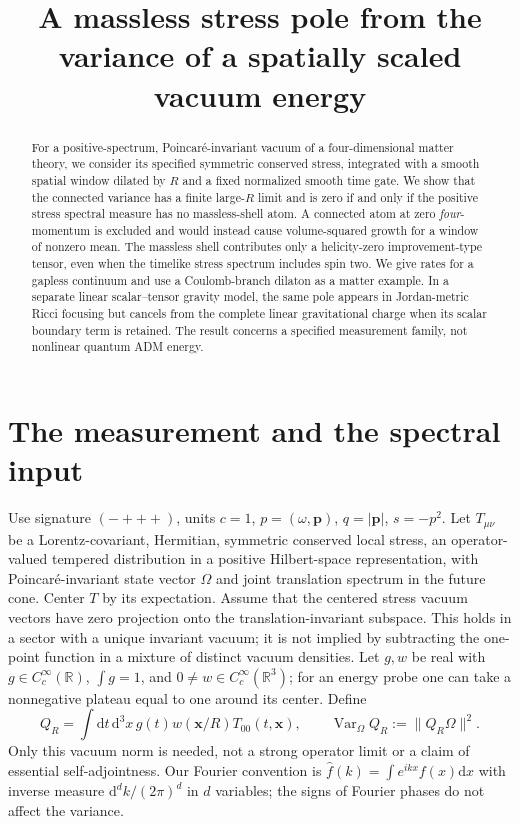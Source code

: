 \documentclass[11pt]{article}
\title{A massless stress pole from the variance of a spatially scaled vacuum energy}
\author{}\date{}
\newcommand{\dd}{\mathrm d}
\newcommand{\Var}{\operatorname{Var}}
\newcommand{\pn}{\boldsymbol p}
\begin{document}
\maketitle
\begin{abstract}
For a positive-spectrum, Poincar\'e-invariant vacuum of a four-dimensional matter theory, we consider its specified symmetric conserved stress, integrated with a smooth spatial window dilated by \(R\) and a fixed normalized smooth time gate. We show that the connected variance has a finite large-\(R\) limit and is zero if and only if the positive stress spectral measure has no massless-shell atom. A connected atom at zero \emph{four}-momentum is excluded and would instead cause volume-squared growth for a window of nonzero mean. The massless shell contributes only a helicity-zero improvement-type tensor, even when the timelike stress spectrum includes spin two. We give rates for a gapless continuum and use a Coulomb-branch dilaton as a matter example. In a separate linear scalar--tensor gravity model, the same pole appears in Jordan-metric Ricci focusing but cancels from the complete linear gravitational charge when its scalar boundary term is retained. The result concerns a specified measurement family, not nonlinear quantum ADM energy.
\end{abstract}

\section{The measurement and the spectral input}
Use signature \((-+++)\), units \(c=1\), \(p=(\omega,\pn)\), \(q=|\pn|\), \(s=-p^2\). Let \(T_{\mu\nu}\) be a Lorentz-covariant, Hermitian, symmetric conserved local stress, an operator-valued tempered distribution in a positive Hilbert-space representation, with Poincar\'e-invariant state vector \(\Omega\) and joint translation spectrum in the future cone. Center \(T\) by its expectation. Assume that the centered stress vacuum vectors have zero projection onto the translation-invariant subspace. This holds in a sector with a unique invariant vacuum; it is not implied by subtracting the one-point function in a mixture of distinct vacuum densities. Let \(g,w\) be real with \(g\in C_c^\infty(\mathbb R)\), \(\int g=1\), and \(0\ne w\in C_c^\infty(\mathbb R^3)\); for an energy probe one can take a nonnegative plateau equal to one around its center. Define
\[
 Q_R=\int \dd t\,\dd^3 x\,g(t)w(\boldsymbol x/R)T_{00}(t,\boldsymbol x),\qquad
 \Var_\Omega Q_R:=\|Q_R\Omega\|^2 .
\]
Only this vacuum norm is needed, not a strong operator limit or a claim of essential self-adjointness. Our Fourier convention is \(\widehat f(k)=\int e^{ikx}f(x)\dd x\) with inverse measure \(\dd^dk/(2\pi)^d\) in \(d\) variables; the signs of Fourier phases do not affect the variance.
\end{document}
